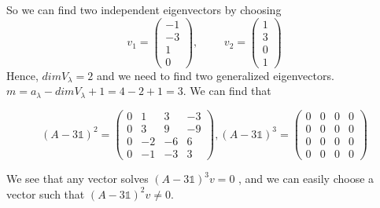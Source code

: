 \documentclass[a4paper,12pt,titlepage]{article}
\begin{document}
So we can find two independent eigenvectors by choosing
$$v_1=\left(\begin{array}{c}
-1\\
-3\\
1\\
0
\end{array}\right),\,\,\,\,\,\,\,\,\,\,\,\,\,\,v_2=\left(\begin{array}{c}
1\\
3\\
0\\
1
\end{array}\right)$$
Hence, $dimV_{\lambda} = 2$ and we need to find two generalized eigenvectors. $m=a_{\lambda}-dimV_{\lambda}+1=4-2+1=3$. We can find that

$$(A-3\mathds{1})^2=\left(\begin{array}{cccc}
0&1&3&-3\\
0&3&9&-9\\
0&-2&-6&6\\
0&-1&-3&3
\end{array}\right),(A-3\mathds{1})^3=\left(\begin{array}{cccc}
0&0&0&0\\
0&0&0&0\\
0&0&0&0\\
0&0&0&0
\end{array}\right)$$

We see that any vector solves $(A - 3\mathds{1})^3v = 0$ , and we can easily choose a vector such that $(A - 3\mathds{1})^2v  \neq 0$. 
\end{document}
